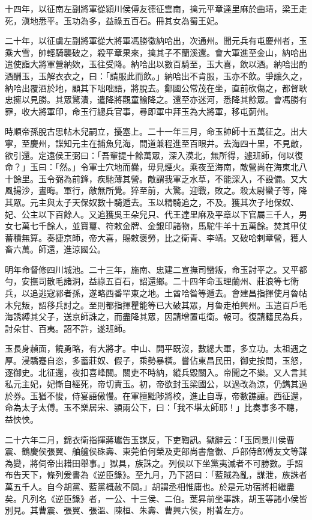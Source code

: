 \begin{pinyinscope}
十四年，以征南左副將軍從潁川侯傅友德征雲南，擒元平章達里麻於曲靖，梁王走死，滇地悉平。玉功為多，益祿五百石。冊其女為蜀王妃。

二十年，以征虜左副將軍從大將軍馮勝徵納哈出，次通州。聞元兵有屯慶州者，玉乘大雪，帥輕騎襲破之，殺平章果來，擒其子不蘭溪還。會大軍進至金山，納哈出遣使詣大將軍營納欸，玉往受降。納哈出以數百騎至，玉大喜，飲以酒。納哈出酌酒酬玉，玉解衣衣之，曰：「請服此而飲。」納哈出不肯服，玉亦不飲。爭讓久之，納哈出覆酒於地，顧其下咄咄語，將脫去。鄭國公常茂在坐，直前砍傷之，都督耿忠擁以見勝。其眾驚潰，遣降將觀童諭降之。還至亦迷河，悉降其餘眾。會馮勝有罪，收大將軍印，命玉行總兵官事，尋即軍中拜玉為大將軍，移屯薊州。

時順帝孫脫古思帖木兒嗣立，擾塞上。二十一年三月，命玉帥師十五萬征之。出大寧，至慶州，諜知元主在捕魚兒海，間道兼程進至百眼井。去海四十里，不見敵，欲引還。定遠侯王弼曰：「吾輩提十餘萬眾，深入漠北，無所得，遽班師，何以復命？」玉曰：「然。」令軍士穴地而爨，毋見煙火。乘夜至海南，敵營尚在海東北八十餘里。玉令弼為前鋒，疾馳薄其營。敵謂我軍乏水草，不能深入，不設備。又大風揚沙，晝晦。軍行，敵無所覺。猝至前，大驚。迎戰，敗之。殺太尉蠻子等，降其眾。元主與太子天保奴數十騎遁去。玉以精騎追之，不及。獲其次子地保奴、妃、公主以下百餘人。又追獲吳王朵兒只、代王達里麻及平章以下官屬三千人，男女七萬七千餘人，並寶璽、符敕金牌、金銀印諸物，馬駝牛羊十五萬餘。焚其甲仗蓄積無算。奏捷京師，帝大喜，賜敕褒勞，比之衛青、李靖。又破哈剌章營，獲人畜六萬。師還，進涼國公。

明年命督修四川城池。二十三年，施南、忠建二宣撫司蠻叛，命玉討平之。又平都勻，安撫司散毛諸洞，益祿五百石，詔還鄉。二十四年命玉理蘭州、莊浪等七衛兵，以追逃寇祁者孫，遂略西番罕東之地。土酋哈昝等遁去。會建昌指揮使月魯帖木兒叛，詔移兵討之。至則都指揮瞿能等已大破其眾，月魯走柏興州。玉遣百戶毛海誘縛其父子，送京師誅之，而盡降其眾，因請增置屯衛。報可。復請籍民為兵，討朵甘、百夷。詔不許，遂班師。

玉長身赬面，饒勇略，有大將才。中山、開平既沒，數總大軍，多立功。太祖遇之厚。浸驕蹇自恣，多蓄莊奴、假子，乘勢暴橫。嘗佔東昌民田，御史按問，玉怒，逐御史。北征還，夜扣喜峰關。關吏不時納，縱兵毀關入。帝聞之不樂。又人言其私元主妃，妃慚自經死，帝切責玉。初，帝欲封玉梁國公，以過改為涼，仍鐫其過於券。玉猶不悛，侍宴語傲慢。在軍擅黜陟將校，進止自專，帝數譙讓。西征還，命為太子太傅。玉不樂居宋、潁兩公下，曰：「我不堪太師耶！」比奏事多不聽，益怏怏。

二十六年二月，錦衣衛指揮蔣瓛告玉謀反，下吏鞫訊。獄辭云：「玉同景川侯曹震、鶴慶侯張翼、舳艫侯硃壽、東莞伯何榮及吏部尚書詹徽、戶部侍郎傅友文等謀為變，將伺帝出耤田舉事。」獄具，族誅之。列侯以下坐黨夷滅者不可勝數。手詔布告天下，條列爰書為《逆臣錄》。至九月，乃下詔曰：「藍賊為亂，謀泄，族誅者萬五千人。自今胡黨、藍黨概赦不問。」胡謂丞相惟庸也。於是元功宿將相繼盡矣。凡列名《逆臣錄》者，一公、十三侯、二伯。葉昇前坐事誅，胡玉等諸小侯皆別見。其曹震、張翼、張溫、陳桓、朱壽、曹興六侯，附著左方。


\end{pinyinscope}
